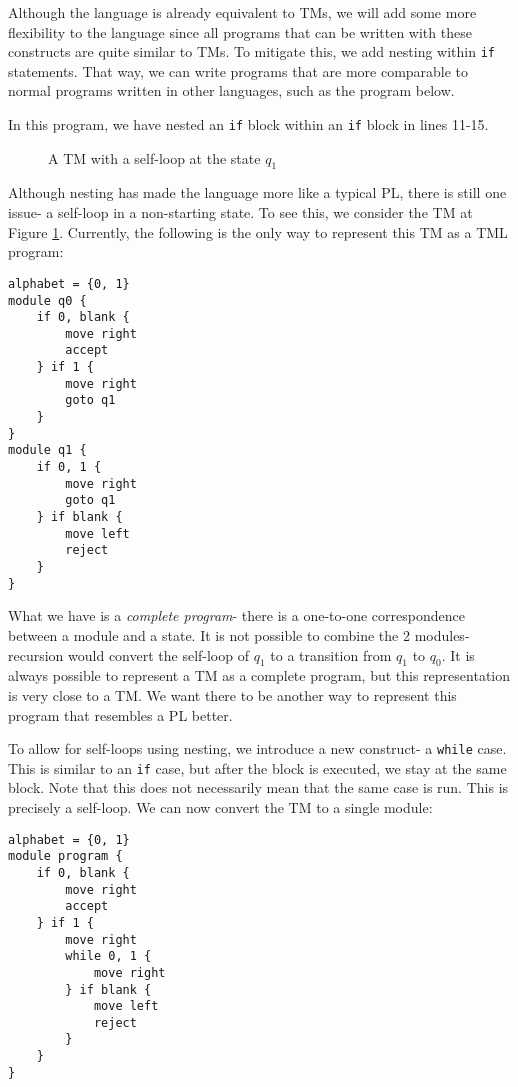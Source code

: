 Although the language is already equivalent to TMs, we will add some more flexibility to the language since all programs that can be written with these constructs are quite similar to TMs. To mitigate this, we add nesting within \texttt{if} statements. That way, we can write programs that are more comparable to normal programs written in other languages, such as the program below.

In this program, we have nested an \texttt{if} block within an \texttt{if} block in lines 11-15.

\begin{figure}[htb]
    \centering
    \caption{A TM with a self-loop at the state $q_1$}
    \label{fig:self-loop-TM}
\end{figure}
Although nesting has made the language more like a typical PL, there is still one issue- a self-loop in a non-starting state. To see this, we consider the TM at Figure \ref{fig:self-loop-TM}. Currently, the following is the only way to represent this TM as a TML program:
\begin{lstlisting}[language=TML]
alphabet = {0, 1}
module q0 {
    if 0, blank {
        move right
        accept
    } if 1 {
        move right
        goto q1
    }
}
module q1 {
    if 0, 1 {
        move right
        goto q1
    } if blank {
        move left
        reject
    }
}
\end{lstlisting}
What we have is a \emph{complete program}- there is a one-to-one correspondence between a module and a state. It is not possible to combine the 2 modules- recursion would convert the self-loop of $q_1$ to a transition from $q_1$ to $q_0$. It is always possible to represent a TM as a complete program, but this representation is very close to a TM. We want there to be another way to represent this program that resembles a PL better.

To allow for self-loops using nesting, we introduce a new construct- a \texttt{while} case. This is similar to an \texttt{if} case, but after the block is executed, we stay at the same block. Note that this does not necessarily mean that the same case is run. This is precisely a self-loop. We can now convert the TM to a single module:
\begin{lstlisting}[language=TML]
alphabet = {0, 1}
module program {
    if 0, blank {
        move right
        accept
    } if 1 {
        move right
        while 0, 1 {
            move right
        } if blank {
            move left
            reject
        }
    }
}
\end{lstlisting}


